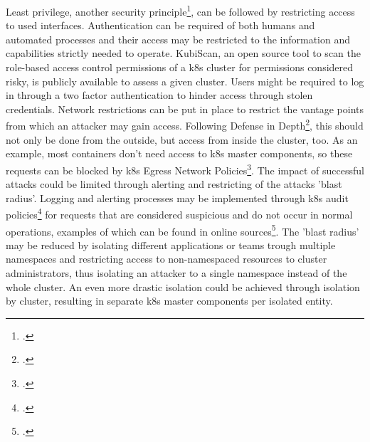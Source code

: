Least privilege, another security principle\footcite[][, p. 3 to 4]{k8sBook}, can be followed by restricting access to used interfaces. Authentication can be required of both humans and automated processes and their access may be restricted to the information and capabilities strictly needed to operate. KubiScan, an open source tool to scan the role-based access control permissions of a \gls{k8s} cluster for permissions considered risky, is publicly available to assess a given cluster. Users might be required to log in through a two factor authentication to hinder access through stolen credentials. Network restrictions can be put in place to restrict the vantage points from which an attacker may gain access.
Following Defense in Depth\footcite[][, p. 3]{k8sBook}, this should not only be done from the outside, but access from inside the cluster, too. As an example, most containers don't need access to \gls{k8s} master components, so these requests can be blocked by \gls{k8s} Egress Network Policies\footcite[][, section 'The NetworkPolicy Resource']{egressNetPol}. The impact of successful attacks could be limited through alerting and restricting of the attacks 'blast radius'. Logging and alerting processes may be implemented through \gls{k8s} audit policies\footcite[][, section 'Audit Policy']{auditPolicy} for requests that are considered suspicious and do not occur in normal operations, examples of which can be found in online sources\footcite[][, section 'Alerting on the Kubernetes infrastructure']{sysdigMonitoring}. The 'blast radius' may be reduced by isolating different applications or teams trough multiple namespaces and restricting access to non-namespaced resources to cluster administrators, thus isolating an attacker to a single namespace instead of the whole cluster. An even more drastic isolation could be achieved through isolation by cluster, resulting in separate \gls{k8s} master components per isolated entity.

